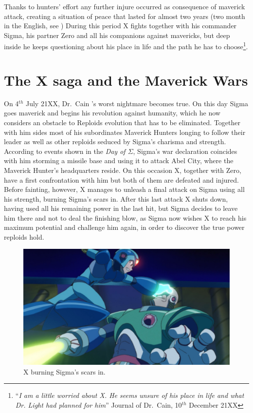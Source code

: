 Thanks to hunters' effort any further injure occurred as consequence of maverick attack, creating a situation of peace that lasted  for almost two years (two month in the English, see \PtIIWarning) During this period X fights together with his commander Sigma, his partner Zero and all his companions against mavericks, but deep inside he keeps questioning about his place in life and the path he has to choose\footnote{``\textit{I am a little worried about X. He seems unsure of his place in life and what Dr. Light had planned for him}'' Journal of Dr.~Cain, 10$^{th}$ December 21XX}.

\section{The X saga and the Maverick Wars}
On 4$^{th}$ July 21XX, Dr.~Cain 's worst nightmare becomes true. On this day Sigma goes maverick and begins his revolution against humanity, which he now considers an obstacle to Reploids evolution that has to be eliminated. Together with him sides most of his subordinates Maverick Hunters longing to follow their leader as well as other reploids seduced by Sigma's charisma and strength. According to events shown in the \textit{Day of $\Sigma$}, Sigma's war declaration coincides with him storming a missile base and using it to attack Abel City, where the Maverick Hunter's headquarters reside. On this occasion X, together with Zero, have a first confrontation with him but both of them are defeated and injured. Before fainting, however, X manages to unleash a final attack on Sigma using all his strength, burning Sigma's scars in. After this last attack X shuts down, having used all his remaining power in the last hit, but Sigma decides to leave him there and not to deal the finishing blow, as Sigma now wishes X to reach his maximum potential and challenge him again, in order to discover the true power reploids hold.
\begin{figure}[htp]
	\centering
	\includegraphics[width=.5\linewidth]{figures/X1/Sigma_scar.jpg}
	\caption{X burning Sigma's scars in.}
\end{figure}

